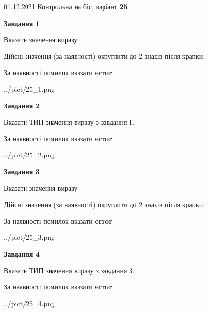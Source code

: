 \documentclass[11pt, ukrainian]{article}
\begin{document}
{01.12.2021 Контрольна на біс, варіант  \No \textbf { 25 }\par}
{
\begin {large}
{\begin {center}\textbf{Завдання 1}\end {center}}\par
Вказати значення виразу. \par
Дійсні значення (за наявності) округлити до 2 знаків після крапки. \par
За наявності помилок вказати \textbf{error}

\begin{center}
	{../pict/25_1.png}
\end{center}
\newpage

{\begin {center}\textbf{Завдання 2}\end {center}}\par
Вказати ТИП значення виразу з завдання 1. \par
За наявності помилок вказати \textbf{error}

\begin{center}
	{../pict/25_2.png}
\end{center}
\newpage

{\begin {center}\textbf{Завдання 3}\end {center}}\par
Вказати значення виразу. \par
Дійсні значення (за наявності) округлити до 2 знаків після крапки. \par
За наявності помилок вказати \textbf{error}

\begin{center}
	{../pict/25_3.png}
\end{center}
\newpage

{\begin {center}\textbf{Завдання 4}\end {center}}\par
Вказати ТИП значення виразу з завдання 3. \par
За наявності помилок вказати \textbf{error}

\begin{center}
	{../pict/25_4.png}
\end{center}
\newpage


\end{large}}
\end{document}
